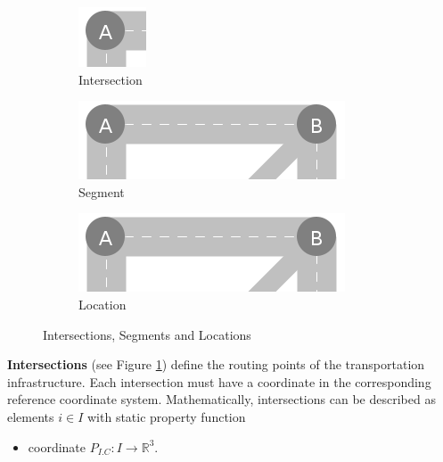 \documentclass[graybox]{svmult}
\begin{document}
\begin{figure}
	\begin{subfigure}{.3\textwidth}
		\centering
		\includegraphics[scale=0.4]{../../concepts/intersection.png}
		\caption{Intersection}
		\label{fig:intersection}
	\end{subfigure}
	\hfill
	\begin{subfigure}{.3\textwidth}
		\centering
		\includegraphics[scale=0.4]{../../concepts/segment.png}
		\caption{Segment}
		\label{fig:segment}
	\end{subfigure}
	\hfill
		\begin{subfigure}{.3\textwidth}
		\centering
		\includegraphics[scale=0.4]{../../concepts/segment.png}
		\caption{Location}
		\label{fig:location}
	\end{subfigure}
	\caption{Intersections, Segments and Locations}
	\label{fig:intersections-segments}	
\end{figure}
\vspace{4mm}

\noindent
\textbf{Intersections} (see Figure \ref{fig:intersection})
define the routing points of the transportation infrastructure.
Each intersection must have a coordinate in the corresponding reference coordinate system.
Mathematically, intersections can be described as elements $i \in I$ with static property function
\begin{itemize}
	\item coordinate $P_{I.C}: I \rightarrow \mathbb{R}^3$.
\end{itemize}
\vspace{2mm}
\end{document}

